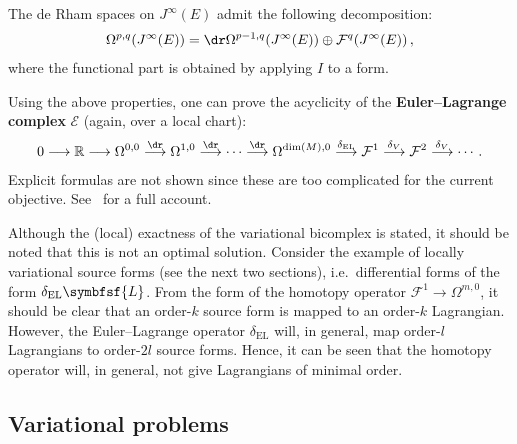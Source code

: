     \begin{result}\label{var:functional_decomposition}
        The de Rham spaces on $J^\infty(E)$ admit the following decomposition:
        \begin{gather}
            \Omega^{p,q}(J^\infty(E)) = \dr\Omega^{p-1,q}(J^\infty(E))\oplus\mathcal{F}^q(J^\infty(E))\,,
        \end{gather}
        where the functional part is obtained by applying $I$ to a form.
    \end{result}

    Using the above properties, one can prove the acyclicity of the \textbf{Euler--Lagrange complex} $\mathcal{E}$ (again, over a local chart):
    \begin{gather}
        0\longrightarrow\mathbb{R}\longrightarrow\Omega^{0,0}\overset{\dr}{\longrightarrow}\Omega^{1,0}\overset{\dr}{\longrightarrow}\cdots\overset{\dr}{\longrightarrow}\Omega^{\dim(M),0}\overset{\delta_\mathrm{EL}}{\longrightarrow}\mathcal{F}^1\overset{\delta_V}{\longrightarrow}\mathcal{F}^2\overset{\delta_V}{\longrightarrow}\cdots\,.
    \end{gather}
    Explicit formulas are not shown since these are too complicated for the current objective. See~\cite{anderson_variational_1992} for a full account.

    \begin{remark}
        Although the (local) exactness of the variational bicomplex is stated, it should be noted that this is not an optimal solution. Consider the example of locally variational source forms (see the next two sections), i.e.~differential forms of the form $\delta_{\text{EL}}\symbfsf{L}$. From the form of the homotopy operator $\mathcal{F}^1\rightarrow\Omega^{m,0}$, it should be clear that an order-$k$ source form is mapped to an order-$k$ Lagrangian. However, the Euler--Lagrange operator $\delta_{\text{EL}}$ will, in general, map order-$l$ Lagrangians to order-$2l$ source forms. Hence, it can be seen that the homotopy operator will, in general, not give Lagrangians of minimal order.
    \end{remark}

\subsection{Variational problems}

